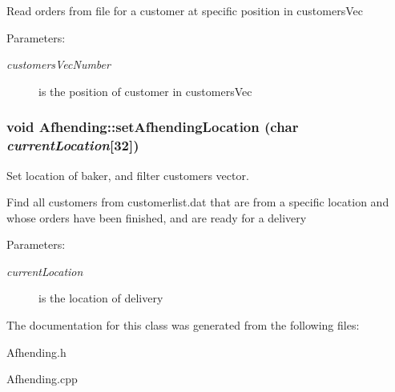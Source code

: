 Read orders from file for a customer at specific position in customers\-Vec

\begin{Desc}
\item[Parameters:]
\begin{description}
\item[{\em customers\-Vec\-Number}]is the position of customer in customers\-Vec \end{description}
\end{Desc}
\hypertarget{class_afhending_411cc45b50d4a59a33d76f6c54e52f78}{
\subsubsection[setAfhendingLocation]{\setlength{\rightskip}{0pt plus 5cm}void Afhending::set\-Afhending\-Location (char {\em current\-Location}\mbox{[}32\mbox{]})}}
\label{class_afhending_411cc45b50d4a59a33d76f6c54e52f78}


Set location of baker, and filter customers vector. 

Find all customers from customerlist.dat that are from a specific location and whose orders have been finished, and are ready for a delivery

\begin{Desc}
\item[Parameters:]
\begin{description}
\item[{\em current\-Location}]is the location of delivery \end{description}
\end{Desc}


The documentation for this class was generated from the following files:\begin{CompactItemize}
\item 
Afhending.h\item 
Afhending.cpp\end{CompactItemize}
